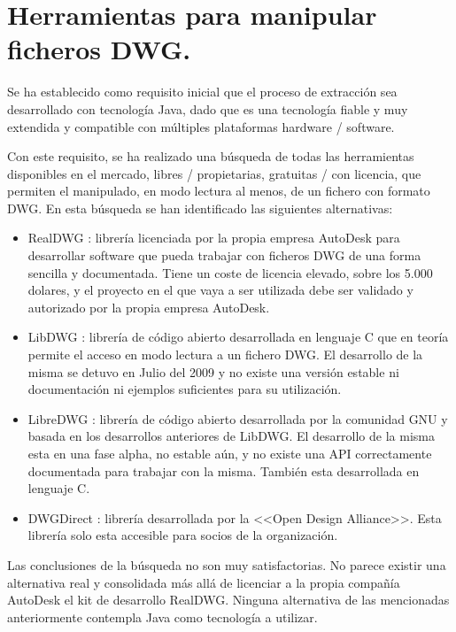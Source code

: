 \section{Herramientas para manipular ficheros DWG.}

Se ha establecido como requisito inicial que el proceso de extracción sea desarrollado con tecnología Java, dado que es una tecnología fiable y muy extendida y compatible con múltiples plataformas hardware / software. 

Con este requisito, se ha realizado una búsqueda de todas las herramientas disponibles en el mercado, libres / propietarias, gratuitas / con licencia, que permiten el manipulado, en modo lectura al menos, de un fichero con formato DWG. En esta búsqueda se han identificado las siguientes alternativas:

\begin{itemize}

\item{RealDWG \cite{RealDWG}: librería licenciada por la propia empresa AutoDesk para desarrollar software que pueda trabajar con ficheros DWG de una forma sencilla y documentada. Tiene un coste de licencia elevado, sobre los 5.000 dolares, y el proyecto en el que vaya a ser utilizada debe ser validado y autorizado por la propia empresa AutoDesk.}

\item{LibDWG \cite{LibDWG}: librería de código abierto desarrollada en lenguaje C que en teoría permite el acceso en modo lectura a un fichero DWG. El desarrollo de la misma se detuvo en Julio del 2009 y no existe una versión estable ni documentación ni ejemplos suficientes para su utilización.}

\item{LibreDWG \cite{LibreDWG}: librería de código abierto desarrollada por la comunidad GNU y basada en los desarrollos anteriores de LibDWG. El desarrollo de la misma esta en una fase alpha, no estable aún, y no existe una API correctamente documentada para trabajar con la misma. También esta desarrollada en lenguaje C.}

\item{DWGDirect \cite{OpenDWG}: librería desarrollada por la <<Open Design Alliance>>. Esta librería solo esta accesible para socios de la organización.}

\end{itemize}

Las conclusiones de la búsqueda no son muy satisfactorias. No parece existir una alternativa real y consolidada más allá de licenciar a la propia compañía AutoDesk el kit de desarrollo RealDWG. Ninguna alternativa de las mencionadas anteriormente contempla Java como tecnología a utilizar.

